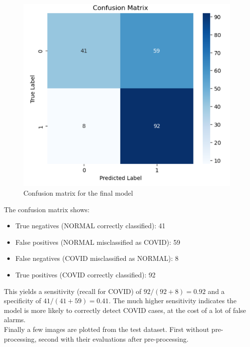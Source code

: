 \documentclass[conference]{IEEEtran}
\begin{document}
\begin{figure}[htbp]
	\centerline{\includegraphics[width=\linewidth]{Images/Transferlearning_3.png}}
	\caption{Confusion matrix for the final model}
	\label{fig:baseline_curves}
\end{figure}

The confusion matrix shows:\\

\begin{itemize}
	\item True negatives (NORMAL correctly classified): 41
	\item False positives (NORMAL misclassified as COVID): 59
	\item False negatives (COVID misclassified as NORMAL): 8
	\item True positives (COVID correctly classified): 92
\end{itemize}

This yields a sensitivity (recall for COVID) of $92/(92+8)=0.92$ and a specificity of $41/(41+59)=0.41$. The much higher sensitivity indicates the model is more likely to correctly detect COVID cases, at the cost of a lot of false alarms. \\ 



Finally a few images are plotted from the test dataset. First without pre-processing, second with their evaluations after pre-processing.\\	
\end{document}
